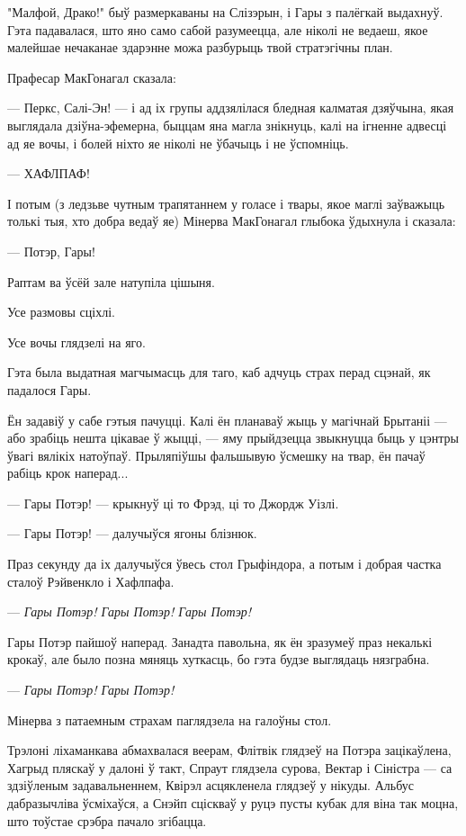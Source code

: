 "Малфой, Драко!" быў размеркаваны на Слізэрын, і Гары з палёгкай выдахнуў. 
Гэта падавалася, што яно само сабой разумеецца, але ніколі не ведаеш, якое
малейшае нечаканае здарэнне можа разбурыць твой стратэгічны план.

Прафесар МакГонагал сказала:

--- Перкс, Салі-Эн! --- і ад іх групы аддзялілася бледная калматая дзяўчына, якая
выглядала дзіўна-эфемерна, быццам яна магла знікнуць, калі на ігненне адвесці ад яе вочы,
і болей ніхто яе ніколі не ўбачыць і не ўспомніць.

--- ХАФЛПАФ!

І потым (з ледзьве чутным трапятаннем у голасе і твары, якое маглі заўважыць толькі
тыя, хто добра ведаў яе) Мінерва МакГонагал глыбока ўдыхнула і сказала:

--- Потэр, Гары!

Раптам ва ўсёй зале натупіла цішыня.

Усе размовы сціхлі.

Усе вочы глядзелі на яго.

Гэта была выдатная магчымасць для таго, каб адчуць страх перад сцэнай, як падалося Гары.

Ён задавіў у сабе гэтыя пачуцці. Калі ён планаваў жыць у магічнай Брытаніі ---
або зрабіць нешта цікавае ў жыцці, --- яму
прыйдзецца звыкнуцца быць у цэнтры ўвагі вялікіх натоўпаў.
Прыляпіўшы фальшывую ўсмешку на твар, ён пачаў рабіць крок наперад...

--- Гары Потэр! --- крыкнуў ці то Фрэд, ці то Джордж Уізлі.

--- Гары Потэр! --- далучыўся ягоны блізнюк.

Праз секунду да іх далучыўся ўвесь стол Грыфіндора, а потым і добрая частка сталоў
Рэйвенкло і Хафлпафа.

--- \emph{Гары Потэр! Гары Потэр! Гары Потэр!}

Гары Потэр пайшоў наперад. Занадта павольна, як ён зразумеў праз некалькі крокаў, але
было позна мяняць хуткасць, бо гэта будзе выглядаць нязграбна.

\later

--- \emph{Гары Потэр! Гары Потэр! }

Мінерва з патаемным страхам паглядзела на галоўны стол.

Трэлоні ліхаманкава абмахвалася веерам, Флітвік глядзеў на Потэра зацікаўлена, 
Хагрыд пляскаў у далоні ў такт, Спраут глядзела сурова, 
Вектар і Сіністра --- са здзіўленым задавальненнем,
Квірэл асцякленела глядзеў у нікуды. Альбус дабразычліва ўсміхаўся, а Снэйп сціскваў у 
руцэ пусты кубак для віна так моцна, што тоўстае срэбра пачало згібацца.

